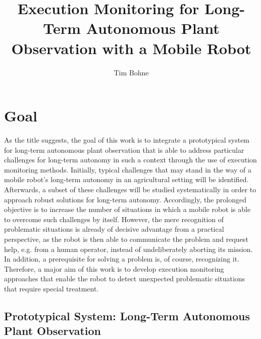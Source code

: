 \documentclass[english, master, expose, utf8]{base/thesis_KBS}
\begin{document}
\title{Execution Monitoring for Long-Term Autonomous Plant Observation with a Mobile Robot}
\author{Tim Bohne}

\generatetitle

\section{Goal}

As the title suggests, the goal of this work is to integrate a prototypical system for long-term autonomous plant observation that is able to address 
particular challenges for long-term autonomy in such a context through the use of execution monitoring methods. Initially, typical challenges that may stand in the way of a mobile
robot's long-term autonomy in an agricultural setting will be identified. Afterwards, a subset of these challenges will be studied systematically in order to 
approach robust solutions for long-term autonomy. Accordingly, the prolonged objective is to increase the number of situations in which a mobile robot is able to 
overcome such challenges by itself. However, the mere recognition of problematic situations is already of decisive advantage from a practical perspective,
as the robot is then able to communicate the problem and request help, e.g. from a human operator, instead of undeliberately aborting its mission.
In addition, a prerequisite for solving a problem is, of course, recognizing it. Therefore, a major aim of this work is to develop execution monitoring
approaches that enable the robot to detect unexpected problematic situations that require special treatment.

\subsection{Prototypical System: Long-Term Autonomous Plant Observation}
\label{sec:prototypical_system}
\end{document}
